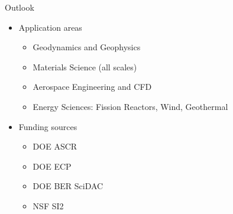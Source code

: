 \documentclass[aspectratio=169]{beamer}
\begin{document}
\begin{frame}{Outlook}
  \begin{itemize}
  \item Application areas
    \begin{itemize}
    \item Geodynamics and Geophysics
    \item Materials Science (all scales)
    \item Aerospace Engineering and CFD
    \item Energy Sciences: Fission Reactors, Wind, Geothermal 
    \end{itemize}
  \item Funding sources
  \begin{itemize}
  \item DOE ASCR
  \item DOE ECP
  \item DOE BER SciDAC
  \item NSF SI2
  \end{itemize}
  \end{itemize}
\end{frame}
\end{document}
